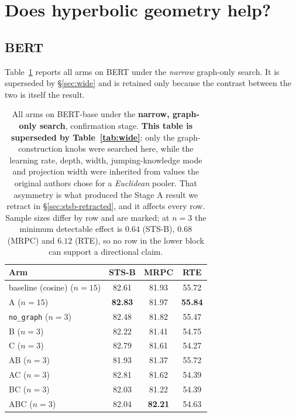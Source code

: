 \documentclass{article} %
\begin{document}
\section{Does hyperbolic geometry help?}
\label{sec:hyperbolic}

\subsection{BERT}
Table~\ref{tab:bert-arms} reports all arms on BERT under the \emph{narrow}
graph-only search. It is superseded by \S\ref{sec:wide} and is retained only
because the contrast between the two is itself the result.

\begin{table}[t]
\caption{All arms on BERT-base under the \textbf{narrow, graph-only search},
confirmation stage. \textbf{This table is superseded by
Table~\ref{tab:wide}}: only the graph-construction knobs were searched here,
while the learning rate, depth, width, jumping-knowledge mode and projection
width were inherited from values the original authors chose for a
\emph{Euclidean} pooler. That asymmetry is what produced the Stage A result we
retract in \S\ref{sec:stsb-retracted}, and it affects every row. Sample sizes
differ by row and are marked; at $n=3$ the minimum detectable effect is $0.64$
(STS-B), $0.68$ (MRPC) and $6.12$ (RTE), so no row in the lower block can
support a directional claim.}
\label{tab:bert-arms}
\begin{center}
\begin{tabular}{lccc}
\toprule
Arm & STS-B & MRPC & RTE \\
\midrule
baseline (cosine) \hfill($n{=}15$) & 82.61 & 81.93 & 55.72 \\
A \hfill($n{=}15$)                 & \textbf{82.83} & 81.97 & \textbf{55.84} \\
\midrule
\texttt{no\_graph} \hfill($n{=}3$) & 82.48 & 81.82 & 55.47 \\
B    \hfill($n{=}3$) & 82.22 & 81.41 & 54.75 \\
C    \hfill($n{=}3$) & 82.79 & 81.61 & 54.27 \\
AB   \hfill($n{=}3$) & 81.93 & 81.37 & 55.72 \\
AC   \hfill($n{=}3$) & 82.81 & 81.62 & 54.39 \\
BC   \hfill($n{=}3$) & 82.03 & 81.22 & 54.39 \\
ABC  \hfill($n{=}3$) & 82.04 & \textbf{82.21} & 54.63 \\
\bottomrule
\end{tabular}
\end{center}
\end{table}
\end{document}
